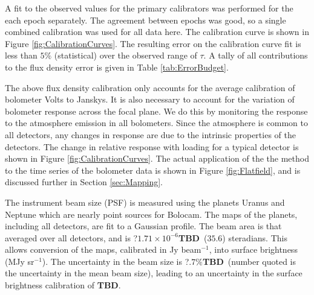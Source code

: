 \documentclass[12pt,preprint]{aastex}
\newcommand{\Check}{{\bf ???}}
\newcommand{\bcamfwhm}{31.2\arcsec}
\newcommand{\TBD}{{\bf TBD}}
\begin{document}
%

A fit to the observed values for the primary calibrators was performed
for the each epoch separately.
The agreement between epochs was good, so a single combined
calibration was used for all data here.
The calibration curve is shown in Figure \ref{fig:CalibrationCurves}.  The
resulting error on the calibration curve fit is less than 
$5\%$ (statistical) over the observed range of $\tau$.  A tally of all
contributions to the flux density error is given in Table
\ref{tab:ErrorBudget}.

The above flux density calibration only accounts for the average
calibration of bolometer Volts to Janskys.  It is also necessary to
account for the variation of bolometer response across the focal
plane.  We do this by monitoring the response to the atmosphere
emission in all bolometers.  Since the atmosphere is common to all
detectors, any changes in response are due to the intrinsic properties
of the detectors.  The change in relative response with loading for a
typical detector is shown in Figure \ref{fig:CalibrationCurves}.  The
actual application of the the method to the time series of the
bolometer data is shown in Figure \ref{fig:Flatfield}, and is
discussed further in Section \ref{sec:Mapping}.

The instrument beam size (PSF) is measured using the planets Uranus
and Neptune which are nearly point sources for Bolocam.
The maps of the planets, including all detectors, are fit to a
Gaussian profile.  The beam area is that averaged over all detectors,
and is ?$1.71\times10^{-6}$\TBD\ ($35.6$\farcs) steradians.  This
allows conversion of the maps, calibrated in Jy beam$^{-1}$, into
surface brightness (MJy sr$^{-1}$).  The uncertainty in the beam size
is ?$.7\%$\TBD\ (number quoted is the uncertainty in the mean beam
size), leading to an uncertainty in the surface brightness calibration
of \TBD.
\end{document}

